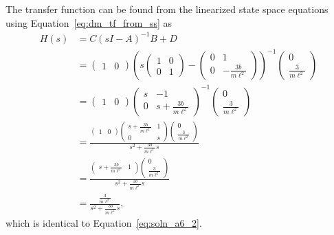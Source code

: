 The transfer function can be found from the linearized state space equations using Equation~\eqref{eq:dm_tf_from_ss} as
\begin{align*}
H(s) &= C(sI-A)^{-1}B+D \\
	&= \begin{pmatrix} 1 & 0 \end{pmatrix} \left(s\begin{pmatrix}1 & 0 \\ 0 & 1 \end{pmatrix} -\begin{pmatrix} 0 & 1 \\ 0 & -\frac{3b}{m\ell^2}\end{pmatrix} \right)^{-1} \begin{pmatrix} 0 \\ \frac{3}{m\ell^2} \end{pmatrix} \\
	&= \begin{pmatrix} 1 & 0 \end{pmatrix} \begin{pmatrix} s & -1 \\ 0 & s+\frac{3b}{m\ell^2}\end{pmatrix}^{-1} \begin{pmatrix} 0 \\ \frac{3}{m\ell^2} \end{pmatrix} \\
	&= \frac{\begin{pmatrix} 1 & 0 \end{pmatrix} \begin{pmatrix} s+\frac{3b}{m\ell^2} & 1 \\ 0 & s \end{pmatrix} \begin{pmatrix} 0 \\ \frac{3}{m\ell^2}\end{pmatrix}}{s^2 + \frac{3b}{m\ell^2}s} \\
	&= \frac{\begin{pmatrix} s+\frac{3b}{m\ell^2} & 1 \end{pmatrix} \begin{pmatrix} 0 \\ \frac{3}{m\ell^2}\end{pmatrix}}{s^2 + \frac{3b}{m\ell^2}s} \\
	&= \frac{\frac{3}{m\ell^2}}{s^2 + \frac{3b}{m\ell^2}s},
\end{align*}
which is identical to Equation~\eqref{eq:soln_a6_2}.
